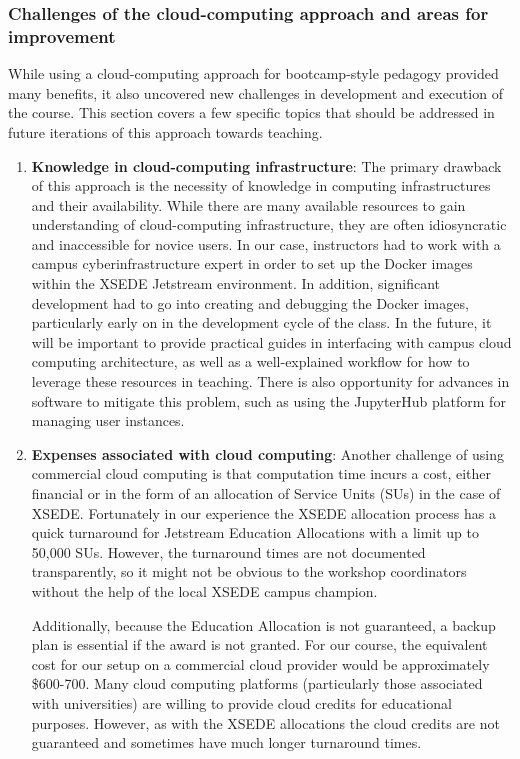 \subsubsection{Challenges of the cloud-computing approach and areas for improvement}

While using a cloud-computing approach for bootcamp-style pedagogy provided many
benefits, it also uncovered new challenges in development and execution of the
course. This section covers a few specific topics that should be addressed in
future iterations of this approach towards teaching.

\begin{enumerate}

\item {\bf Knowledge in cloud-computing infrastructure}: The primary drawback of
this approach is the necessity of knowledge in computing infrastructures and
their availability. While there are many available resources to gain
understanding of cloud-computing infrastructure, they are often idiosyncratic and
inaccessible for novice users. In our case, instructors had to work with a
campus cyberinfrastructure expert in order to set up the Docker images within
the XSEDE Jetstream environment. In addition, significant development had to go
into creating and debugging the Docker images, particularly early on in the
development cycle of the class. In the future, it will be important to provide
practical guides in interfacing with campus cloud computing architecture, as
well as a well-explained workflow for how to leverage these resources in
teaching. There is also opportunity for advances in software to mitigate this
problem, such as using the JupyterHub \cite{perez2015project} platform
for managing user instances.

\item {\bf Expenses associated with cloud computing}: Another challenge of using
commercial cloud computing is that computation time incurs a cost, either
financial or in the form of an allocation of Service Units (SUs) in the case of
XSEDE. Fortunately in our experience the XSEDE allocation process has a quick
turnaround for Jetstream Education Allocations with a limit up to 50,000 SUs.
However, the turnaround times are not documented transparently, so it might not
be obvious to the workshop coordinators without the help of the local XSEDE campus
champion.

Additionally, because the Education Allocation is not guaranteed, a backup plan
is essential if the award is not granted. For our course, the equivalent cost
for our setup on a commercial cloud provider would be approximately \$600-700.
Many cloud computing platforms (particularly those associated with universities)
are willing to provide cloud credits for educational purposes. However, as with
the XSEDE allocations the cloud credits are not guaranteed and sometimes have
much longer turnaround times.


\end{enumerate}
